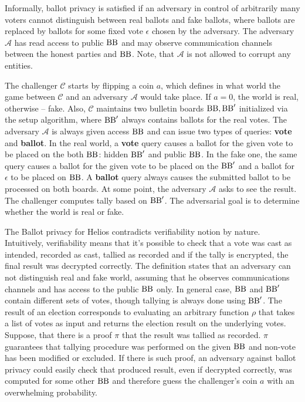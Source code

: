 Informally, ballot privacy is satisfied if an adversary in control of arbitrarily many voters cannot distinguish between real ballots and fake ballots, where ballots are replaced by ballots for some fixed vote $\epsilon$ chosen by the adversary. The adversary $\mathcal{A}$ has read access to public $\operatorname{BB}$ and may observe communication channels between the honest parties and $\operatorname{BB}$. Note, that $\mathcal{A}$  is not allowed to corrupt any entities. \\

\theoremstyle{definition}
\begin{definition}
The challenger $\mathcal{C}$ starts by flipping a coin $a$, which defines in what world the game between $\mathcal{C}$ and an adversary  $\mathcal{A}$ would take place.  If $a=0$, the world is real, otherwise -- fake. Also, $\mathcal{C}$  maintains two bulletin boards $\operatorname{BB},\operatorname{BB}'$ initialized via the setup algorithm, where $\operatorname{BB}'$ always contains ballots for the real votes.  The adversary $\mathcal{A}$ is always given access $\operatorname{BB}$ and can issue two types of queries: \textbf{vote} and \textbf{ballot}.  In the real world, a \textbf{vote} query causes a ballot for the given vote to be placed on the both $\operatorname{BB}$: hidden $\operatorname{BB}'$ and public $\operatorname{BB}$. In the fake one, the same query causes a ballot for the given vote to be placed on the $\operatorname{BB}'$ and a ballot for $\epsilon$  to be placed on $\operatorname{BB}$. A \textbf{ballot} query always causes the submitted ballot to be processed on both boards. At some point, the adversary $\mathcal{A}$ asks to see the result. The challenger computes tally based on $\operatorname{BB}'$. The adversarial goal is to determine whether the world is real or fake.\\
\end{definition}

The Ballot privacy for Helios contradicts verifiability notion by nature. Intuitively, verifiability means that it's possible to check that a vote was cast as intended, recorded as cast, tallied as recorded and if the tally is encrypted, the final result was decrypted correctly. The definition states that an adversary can not distinguish real and fake world, assuming that he observes communications channels and has access to the public $\operatorname{BB}$ only. In general case, $\operatorname{BB}$ and $\operatorname{BB}'$ contain different sets of votes, though tallying is always done using $\operatorname{BB}'$. The result of an election corresponds to evaluating an arbitrary function $\rho$ that takes a list of votes as input and returns the election result on the underlying votes. Suppose, that there is a proof $\pi$ that the result was tallied as recorded. $\pi$ guarantees that tallying procedure was performed on the given $\operatorname{BB}$ and non-vote has been modified or excluded. If there is such proof, an adversary against ballot privacy could easily check that produced result, even if decrypted correctly, was computed for some other $\operatorname{BB}$ and therefore guess the challenger's coin $a$ with an overwhelming probability. \\

